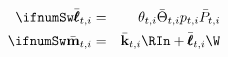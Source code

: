 \begin{eqnarray}
   \ifnumSw  \bar{\pmb{\ell}}_{t,i} & = & \theta_{t,i}\bar{\Theta}_{t,i}{p}_{t,i}\bar{{P}}_{t,i} %
\\ \ifnumSw  \bar{\mathbf{m}}_{t,i} & = & \bar{\mathbf{k}}_{t,i} \RIn + \bar{\pmb{\ell}}_{t,i} \W
\end{eqnarray}
